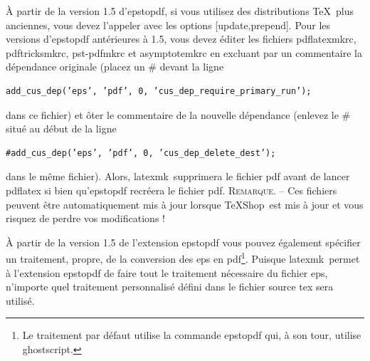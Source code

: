 \documentclass[11pt,french]{article}
\newcommand{\TS}{\textsf{\TeX Shop}}
\newcommand{\latexmk}{\textsf{latexmk}}
\newcommand{\cmd}[1]{\textsf{#1}}
\newcommand{\To}{\,\(\to\)\,}
\begin{document}
À partir de la version 1.5 d'\cmd{epstopdf}, si vous utilisez des distributions \TeX\ plus anciennes, vous devez l'appeler avec les options \cmd{[update,prepend]}. Pour les versions d'\cmd{epstopdf} antérieures à 1.5, vous devez éditer les fichiers \cmd{pdflatexmkrc}, \cmd{pdftricksmkrc}, \cmd{pst-pdfmkrc} et \cmd{asymptotemkrc} en excluant par un commentaire la dépendance originale (placez un \# devant la ligne
\begin{verbatim}
add_cus_dep(’eps’, ’pdf’, 0, ’cus_dep_require_primary_run’);
\end{verbatim}
dans ce fichier) et ôter le commentaire de la nouvelle dépendance (enlevez le \# situé au début de la ligne
\begin{verbatim}
#add_cus_dep(’eps’, ’pdf’, 0, ’cus_dep_delete_dest’);
\end{verbatim}
dans le même fichier). Alors, \latexmk\ supprimera le fichier \cmd{pdf} avant de lancer \cmd{pdflatex} si bien qu'\cmd{epstopdf} recréera le fichier \cmd{pdf}. \textsc{Remarque}. -- Ces fichiers peuvent être automatiquement mis à jour lorsque \TS\ est mis à jour et vous risquez de perdre vos modifications !

À partir de la version 1.5 de l'extension \cmd{epstopdf} vous pouvez également spécifier un traitement, propre, de la conversion des \cmd{eps} en \cmd{pdf}\footnote{Le traitement par défaut utilise la commande \cmd{epstopdf} qui, à son tour, utilise \cmd{ghostscript}.}. Puisque \latexmk\ permet à l'extension \cmd{epstopdf} de faire tout le traitement nécessaire du fichier \cmd{eps}, n'importe quel traitement personnalisé défini dans le fichier source \cmd{tex} sera utilisé.

%
\end{document}
